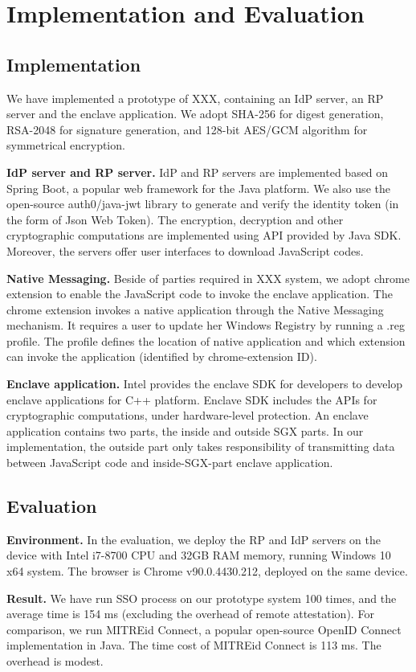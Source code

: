 \section{Implementation and Evaluation}
\label{sec:implementation}
\subsection{Implementation}
We have implemented  a prototype of XXX, containing an IdP server, an RP server and the enclave application. 
We adopt SHA-256 for digest generation, RSA-2048 for signature generation, and 128-bit AES/GCM algorithm for symmetrical encryption. 

\noindent\textbf{IdP server and RP server.}
IdP and RP servers are implemented based on Spring Boot, a popular web framework for the Java platform. We also use the open-source auth0/java-jwt library to generate and verify the identity token (in the form of Json Web Token). The encryption, decryption and other cryptographic computations are implemented using API provided by Java SDK. Moreover, the servers offer user interfaces to download JavaScript codes.

\noindent\textbf{Native Messaging.}
Beside of parties required in XXX system, we adopt chrome extension to enable the JavaScript code to invoke the enclave application. The chrome extension invokes a native application through the Native Messaging mechanism. It requires a user to update her Windows Registry by running a .reg profile. The profile defines the location of native application and which extension can invoke the application (identified by chrome-extension ID). 

\noindent\textbf{Enclave application.}
Intel provides the enclave SDK for developers to develop enclave applications for C++ platform. Enclave SDK includes the APIs for cryptographic computations, under hardware-level protection. An enclave application contains two parts, the inside and outside SGX parts. In our implementation, the outside part only takes responsibility of transmitting data between JavaScript code and inside-SGX-part enclave application.  

\subsection{Evaluation}
\noindent\textbf{Environment.}
In the evaluation, we deploy the RP and IdP servers on the device with Intel i7-8700 CPU and 32GB RAM memory, running Windows 10 x64 system. The browser is Chrome v90.0.4430.212, deployed on the same device.   



\noindent\textbf{Result.}
We have run SSO process on our prototype system 100 times, and the average time is 154 ms (excluding the overhead of remote attestation). For comparison, we run MITREid Connect, a popular open-source OpenID Connect implementation in Java. The time cost of  MITREid Connect is 113 ms. The overhead is modest.